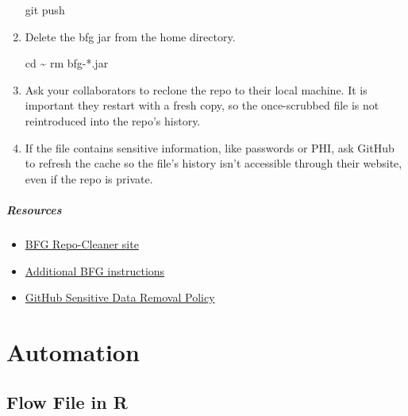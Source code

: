 \documentclass[
]{book}
\newenvironment{Shaded}{\begin{snugshade}}{\end{snugshade}}
\newcommand{\BuiltInTok}[1]{#1}
\newcommand{\FunctionTok}[1]{\textcolor[rgb]{0.00,0.00,0.00}{#1}}
\newcommand{\NormalTok}[1]{#1}
\providecommand{\tightlist}{%
  \setlength{\itemsep}{0pt}\setlength{\parskip}{0pt}}
\begin{document}
\begin{enumerate}
\begin{Shaded}
\begin{Highlighting}[]
\FunctionTok{git}\NormalTok{ push}
\end{Highlighting}
\end{Shaded}
\item
  Delete the bfg jar from the home directory.

\begin{Shaded}
\begin{Highlighting}[]
\BuiltInTok{cd}\NormalTok{ \textasciitilde{}}
\FunctionTok{rm}\NormalTok{ bfg{-}*.jar}
\end{Highlighting}
\end{Shaded}
\item
  Ask your collaborators to reclone the repo to their local machine. It is important they restart with a fresh copy, so the once-scrubbed file is not reintroduced into the repo's history.
\item
  If the file contains sensitive information, like passwords or PHI, ask GitHub to refresh the cache so the file's history isn't accessible through their website, even if the repo is private.
\end{enumerate}

\hypertarget{resources}{%
\paragraph{Resources}\label{resources}}

\begin{itemize}
\tightlist
\item
  \href{https://rtyley.github.io/bfg-repo-cleaner/}{BFG Repo-Cleaner site}
\item
  \href{https://github.com/IBM/BluePic/wiki/Using-BFG-Repo-Cleaner-tool-to-remove-sensitive-files-from-your-git-repo}{Additional BFG instructions}
\item
  \href{https://help.github.com/articles/github-sensitive-data-removal-policy/}{GitHub Sensitive Data Removal Policy}
\end{itemize}

\hypertarget{automation}{%
\chapter{Automation}\label{automation}}

\hypertarget{flow-file-in-r}{%
\section{Flow File in R}\label{flow-file-in-r}}
\end{document}
